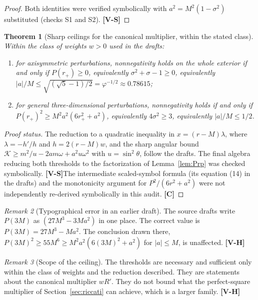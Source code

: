 \documentclass[11pt, a4paper]{article}
\newcommand{\VS}{\textcolor{vs}{\textbf{[V-S]}}}
\newcommand{\VH}{\textcolor{vh}{\textbf{[V-H]}}}
\newcommand{\CC}{\textcolor{cc}{\textbf{[C]}}}
\newtheorem{theorem}{Theorem}[section]
\theoremstyle{remark}
\newtheorem{remark}[theorem]{Remark}
\theoremstyle{definition}
\begin{document}
\begin{proof}
Both identities were verified symbolically with $a^2 = M^2(1-\sigma^2)$ substituted (checks S1 and S2). \VS
\end{proof}

\begin{theorem}[Sharp ceilings for the canonical multiplier, within the stated class]
\label{thm:ceil}
Within the class of weights $w>0$ used in the drafts:
\begin{enumerate}[label=(\alph*)]
\item for axisymmetric perturbations, nonnegativity holds on the whole exterior if and only if $P(r_+)\ge 0$, equivalently $\sigma^2+\sigma-1 \ge 0$, equivalently $|a|/M \le \sqrt{(\sqrt5-1)/2} = \varphi^{-1/2} \approx 0.78615$;
\item for general three-dimensional perturbations, nonnegativity holds if and only if $P(r_+)^2 \ge M^2a^2(6r_+^2+a^2)$, equivalently $4\sigma^2 \ge 3$, equivalently $|a|/M \le 1/2$.
\end{enumerate}
\end{theorem}

\begin{proof}[Proof status]
The reduction to a quadratic inequality in $x = (r-M)\lambda$, where $\lambda = -h'/h$ and $h = 2(r-M)w$, and the sharp angular bound $\mathcal{K} \ge m^2/u - 2am\omega + a^2u\omega^2$ with $u = \sin^2\theta$, follow the drafts. The final algebra reducing both thresholds to the factorization of Lemma~\ref{lem:Prp} was checked symbolically. \VS The intermediate scaled-symbol formula (its equation (14) in the drafts) and the monotonicity argument for $P^2/(6r^2+a^2)$ were not independently re-derived symbolically in this audit. \CC
\end{proof}

\begin{remark}[Typographical error in an earlier draft]
The source drafts write $P(3M)$ as $(27M^3 - 3Ma^2)$ in one place. The correct value is $P(3M) = 27M^3 - Ma^2$. The conclusion drawn there, $P(3M)^2 \ge 55M^6 \ge M^2a^2(6(3M)^2+a^2)$ for $|a|\le M$, is unaffected. \VH
\end{remark}

\begin{remark}[Scope of the ceiling]
The thresholds are necessary and sufficient only within the class of weights and the reduction described. They are statements about the canonical multiplier $wR'$. They do not bound what the perfect-square multiplier of Section~\ref{sec:riccati} can achieve, which is a larger family. \VH
\end{remark}
\end{document}
